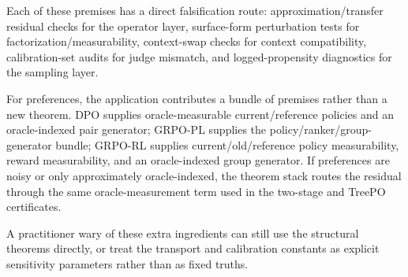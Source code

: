Each of these premises has a direct falsification route: approximation/transfer residual checks for the operator layer, surface-form perturbation tests for factorization/measurability, context-swap checks for context compatibility, calibration-set audits for judge mismatch, and logged-propensity diagnostics for the sampling layer.

For preferences, the application contributes a bundle of premises rather
than a new theorem. DPO supplies oracle-measurable current/reference
policies and an oracle-indexed pair generator; GRPO-PL supplies the
policy/ranker/group-generator bundle; GRPO-RL supplies current/old/reference
policy measurability, reward measurability, and an oracle-indexed group
generator. If preferences are noisy or only approximately oracle-indexed,
the theorem stack routes the residual through the same oracle-measurement
term used in the two-stage and TreePO certificates.

A practitioner wary of these extra ingredients can still use the structural theorems directly, or treat the transport and calibration constants as explicit sensitivity parameters rather than as fixed truths.
